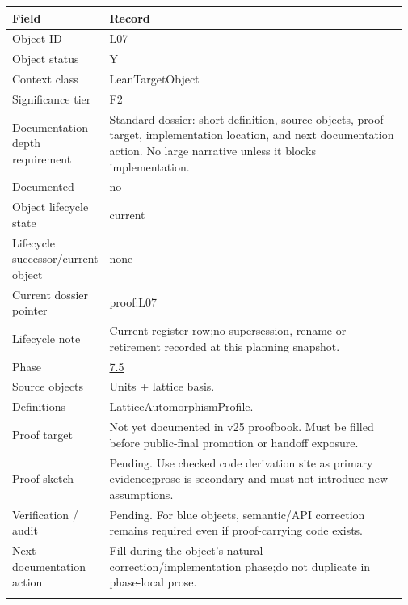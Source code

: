 \begin{longtable}{L{0.16\linewidth} L{0.81\linewidth}}
\hline
\textbf{Field} & \textbf{Record}\\
\hline
Object ID & \hyperlink{object-row-L07}{L07}\\
\hline\addlinespace[0.20em]
Object status & Y\\
\hline\addlinespace[0.20em]
Context class & LeanTargetObject\\
\hline\addlinespace[0.20em]
Significance tier & F2\\
\hline\addlinespace[0.20em]
Documentation depth requirement & Standard dossier: short definition, source objects, proof target, implementation location, and next documentation action. No large narrative unless it blocks implementation.\\
\hline\addlinespace[0.20em]
Documented & no\\
\hline\addlinespace[0.20em]
Object lifecycle state & current\\
\hline\addlinespace[0.20em]
Lifecycle successor/\allowbreak{}current object & none\\
\hline\addlinespace[0.20em]
Current dossier pointer & proof:L07\\
\hline\addlinespace[0.20em]
Lifecycle note & Current register row;\newline no supersession, rename or retirement recorded at this planning snapshot.\\
\hline\addlinespace[0.20em]
Phase & \hyperlink{phase-row-7-5}{7.5}\\
\hline\addlinespace[0.20em]
Source objects & Units + lattice basis.\\
\hline\addlinespace[0.20em]
Definitions & LatticeAutomorphismProfile.\\
\hline\addlinespace[0.20em]
Proof target & Not yet documented in v25 proofbook. Must be filled before public-final promotion or handoff exposure.\\
\hline\addlinespace[0.20em]
Proof sketch & Pending. Use checked code derivation site as primary evidence;\newline prose is secondary and must not introduce new assumptions.\\
\hline\addlinespace[0.20em]
Verification /\allowbreak{} audit & Pending. For blue objects, semantic/\allowbreak{}API correction remains required even if proof-carrying code exists.\\
\hline\addlinespace[0.20em]
Next documentation action & Fill during the object's natural correction/\allowbreak{}implementation phase;\newline do not duplicate in phase-local prose.\\
\hline\addlinespace[0.20em]
\end{longtable}
